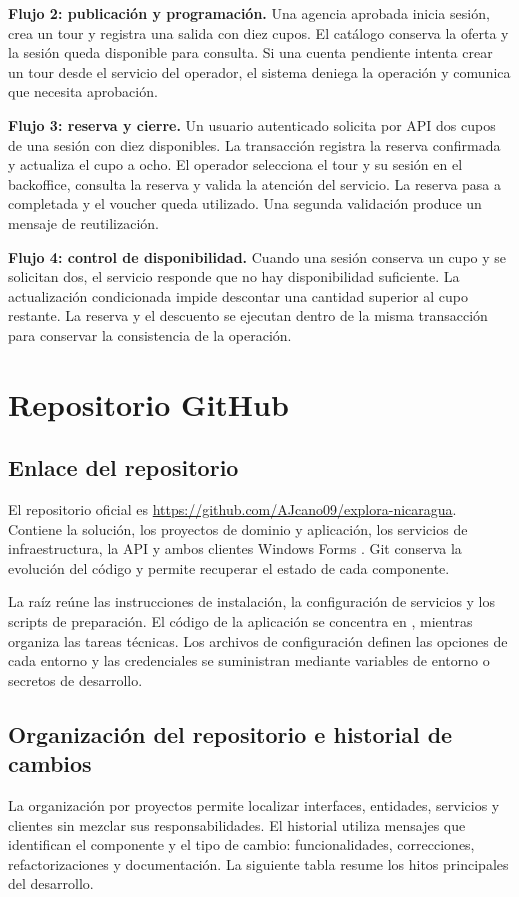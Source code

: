 \textbf{Flujo 2: publicación y programación.} Una agencia aprobada inicia sesión, crea un tour y registra una salida con diez cupos. El catálogo conserva la oferta y la sesión queda disponible para consulta. Si una cuenta pendiente intenta crear un tour desde el servicio del operador, el sistema deniega la operación y comunica que necesita aprobación.

\textbf{Flujo 3: reserva y cierre.} Un usuario autenticado solicita por API dos cupos de una sesión con diez disponibles. La transacción registra la reserva confirmada y actualiza el cupo a ocho. El operador selecciona el tour y su sesión en el backoffice, consulta la reserva y valida la atención del servicio. La reserva pasa a completada y el voucher queda utilizado. Una segunda validación produce un mensaje de reutilización.

\textbf{Flujo 4: control de disponibilidad.} Cuando una sesión conserva un cupo y se solicitan dos, el servicio responde que no hay disponibilidad suficiente. La actualización condicionada impide descontar una cantidad superior al cupo restante. La reserva y el descuento se ejecutan dentro de la misma transacción para conservar la consistencia de la operación.

\section{Repositorio GitHub}
\subsection{Enlace del repositorio}
El repositorio oficial es \url{https://github.com/AJcano09/explora-nicaragua}. Contiene la solución, los proyectos de dominio y aplicación, los servicios de infraestructura, la API y ambos clientes Windows Forms \cite{ref19}. Git conserva la evolución del código y permite recuperar el estado de cada componente.

La raíz reúne las instrucciones de instalación, la configuración de servicios y los scripts de preparación. El código de la aplicación se concentra en , mientras  organiza las tareas técnicas. Los archivos de configuración definen las opciones de cada entorno y las credenciales se suministran mediante variables de entorno o secretos de desarrollo.

\subsection{Organización del repositorio e historial de cambios}
La organización por proyectos permite localizar interfaces, entidades, servicios y clientes sin mezclar sus responsabilidades. El historial utiliza mensajes que identifican el componente y el tipo de cambio: funcionalidades, correcciones, refactorizaciones y documentación. La siguiente tabla resume los hitos principales del desarrollo.

